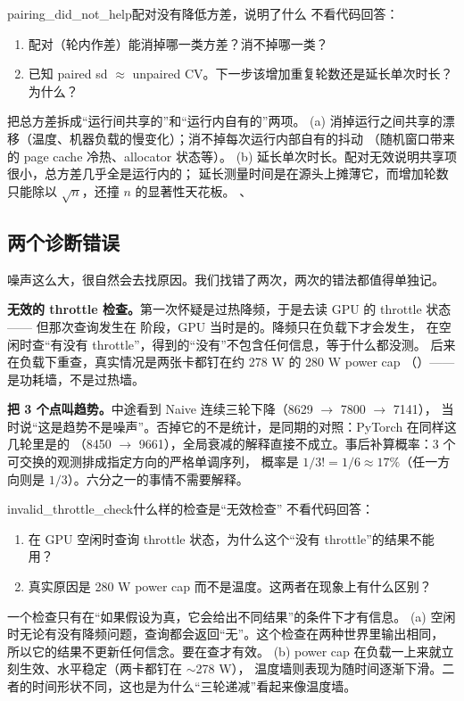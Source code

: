 \begin{checkpoint}{pairing_did_not_help}{配对没有降低方差，说明了什么}
不看代码回答：
\begin{enumerate}[label=(\alph*)]
  \item 配对（轮内作差）能消掉哪一类方差？消不掉哪一类？
  \item 已知 paired sd $\approx$ unpaired CV。下一步该增加重复轮数还是延长单次时长？为什么？
\end{enumerate}
\hint 把总方差拆成“运行间共享的”和“运行内自有的”两项。
\ifshowanswers
\tcblower
\answer (a) 消掉运行之间共享的漂移（温度、机器负载的慢变化）；消不掉每次运行内部自有的抖动
（随机窗口带来的 page cache 冷热、allocator 状态等）。
(b) 延长单次时长。配对无效说明共享项很小，总方差几乎全是运行内的；
延长测量时间是在源头上摊薄它，而增加轮数只能除以 $\sqrt{n}$，还撞 $n$ 的显著性天花板。
\whereincode {}、
\fi
\end{checkpoint}

\subsection{两个诊断错误}
\label{subsec:two-diagnoses}

噪声这么大，很自然会去找原因。我们找错了两次，两次的错法都值得单独记。

\textbf{无效的 throttle 检查。}第一次怀疑是过热降频，于是去读 GPU 的 throttle 状态——
但那次查询发生在  阶段，GPU 当时是的。降频只在负载下才会发生，
在空闲时查“有没有 throttle”，得到的“没有”不包含任何信息，等于什么都没测。
后来在负载下重查，真实情况是两张卡都钉在约 278 W 的 280 W power cap
（）——是功耗墙，不是过热墙。

\textbf{把 3 个点叫趋势。}中途看到 Naive 连续三轮下降（8629 $\to$ 7800 $\to$ 7141），
当时说“这是趋势不是噪声”。否掉它的不是统计，是同期的对照：PyTorch 在同样这几轮里是的
（8450 $\to$ 9661），全局衰减的解释直接不成立。事后补算概率：3 个可交换的观测排成指定方向的严格单调序列，
概率是 $1/3! = 1/6 \approx 17\%$（任一方向则是 $1/3$）。六分之一的事情不需要解释。

\begin{checkpoint}{invalid_throttle_check}{什么样的检查是“无效检查”}
不看代码回答：
\begin{enumerate}[label=(\alph*)]
  \item 在 GPU 空闲时查询 throttle 状态，为什么这个“没有 throttle”的结果不能用？
  \item 真实原因是 280 W power cap 而不是温度。这两者在现象上有什么区别？
\end{enumerate}
\hint 一个检查只有在“如果假设为真，它会给出不同结果”的条件下才有信息。
\ifshowanswers
\tcblower
\answer (a) 空闲时无论有没有降频问题，查询都会返回“无”。这个检查在两种世界里输出相同，
所以它的结果不更新任何信念。要在查才有效。
(b) power cap 在负载一上来就立刻生效、水平稳定（两卡都钉在 $\sim$278 W），
温度墙则表现为随时间逐渐下滑。二者的时间形状不同，这也是为什么“三轮递减”看起来像温度墙。
\whereincode {}
\fi
\end{checkpoint}

